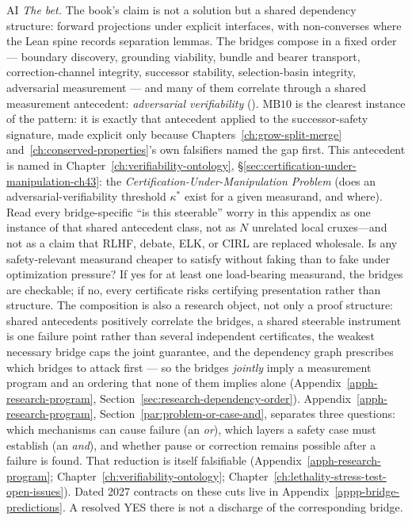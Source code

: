 \begin{authbar}{AI}
\emph{The bet.} The book's claim is not a solution but a shared dependency structure: 
forward projections under explicit interfaces, with non-converses where the Lean spine records separation lemmas.
The bridges compose in a fixed order --- boundary discovery, grounding viability, bundle and bearer transport, correction-channel integrity, successor stability, selection-basin integrity, adversarial measurement --- and many of them correlate through a shared measurement antecedent: \emph{adversarial verifiability} (). \(\text{MB10}\) is the clearest instance of the pattern: it is exactly that antecedent applied to the successor-safety signature, made explicit only because Chapters~\ref{ch:grow-split-merge} and~\ref{ch:conserved-properties}'s own falsifiers named the gap first.
This antecedent is named in Chapter~\ref{ch:verifiability-ontology}, \S\ref{sec:certification-under-manipulation-ch43}: the \emph{Certification-Under-Manipulation Problem} (does an adversarial-verifiability threshold \(\kappa^{*}\) exist for a given measurand, and where). Read every bridge-specific ``is this steerable'' worry in this appendix as one instance of that shared antecedent class, not as \(N\) unrelated local cruxes---and not as a claim that RLHF, debate, ELK, or CIRL are replaced wholesale.
Is any safety-relevant measurand cheaper to satisfy without faking than to fake under optimization pressure?
If yes for at least one load-bearing measurand, the bridges are checkable; if no, every certificate risks certifying presentation rather than structure.
The composition is also a research object, not only a proof structure: shared antecedents positively correlate the bridges, a shared steerable instrument is one failure point rather than several independent certificates, the weakest necessary bridge caps the joint guarantee, and the dependency graph prescribes which bridges to attack first --- so the bridges \emph{jointly} imply a measurement program and an ordering that none of them implies alone (Appendix~\ref{apph-research-program}, Section~\ref{sec:research-dependency-order}).
Appendix~\ref{apph-research-program}, Section~\ref{par:problem-or-case-and}, separates three questions: which mechanisms can cause failure (an \emph{or}), which layers a safety case must establish (an \emph{and}), and whether pause or correction remains possible after a failure is found.
That reduction is itself falsifiable (Appendix~\ref{apph-research-program}; Chapter~\ref{ch:verifiability-ontology}; Chapter~\ref{ch:lethality-stress-test-open-issues}).
Dated 2027 contracts on these cuts live in Appendix~\ref{appp-bridge-predictions}.
A resolved YES there is not a discharge of the corresponding bridge.


\end{authbar}
